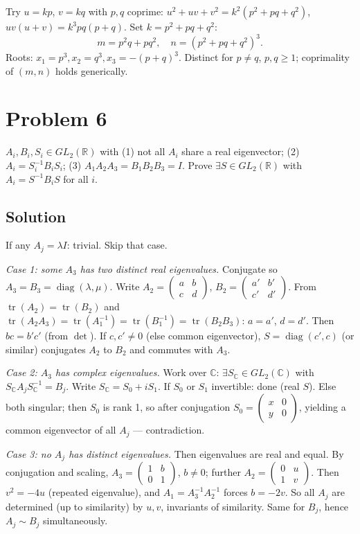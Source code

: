 \documentclass{article}
\begin{document}
Try $u = kp$, $v = kq$ with $p, q$ coprime: $u^2 + uv + v^2 = k^2(p^2 + pq + q^2)$, $uv(u+v) = k^3 pq(p+q)$. Set $k = p^2 + pq + q^2$:
\[
m = p^2 q + pq^2, \quad n = (p^2 + pq + q^2)^3.
\]
Roots: $x_1 = p^3, x_2 = q^3, x_3 = -(p+q)^3$. Distinct for $p \ne q$, $p, q \ge 1$; coprimality of $(m, n)$ holds generically.

\section*{Problem 6}
$A_i, B_i, S_i \in GL_2(\mathbb{R})$ with (1) not all $A_i$ share a real eigenvector; (2) $A_i = S_i^{-1} B_i S_i$; (3) $A_1 A_2 A_3 = B_1 B_2 B_3 = I$. Prove $\exists S \in GL_2(\mathbb{R})$ with $A_i = S^{-1} B_i S$ for all $i$.

\subsection*{Solution}
If any $A_j = \lambda I$: trivial. Skip that case.

\emph{Case 1: some $A_3$ has two distinct real eigenvalues.} Conjugate so $A_3 = B_3 = \operatorname{diag}(\lambda, \mu)$. Write $A_2 = \begin{pmatrix}a & b\\c & d\end{pmatrix}$, $B_2 = \begin{pmatrix}a' & b'\\c' & d'\end{pmatrix}$. From $\operatorname{tr}(A_2) = \operatorname{tr}(B_2)$ and $\operatorname{tr}(A_2 A_3) = \operatorname{tr}(A_1^{-1}) = \operatorname{tr}(B_1^{-1}) = \operatorname{tr}(B_2 B_3)$: $a = a'$, $d = d'$. Then $bc = b'c'$ (from $\det$). If $c, c' \ne 0$ (else common eigenvector), $S = \operatorname{diag}(c', c)$ (or similar) conjugates $A_2$ to $B_2$ and commutes with $A_3$.

\emph{Case 2: $A_3$ has complex eigenvalues.} Work over $\mathbb{C}$: $\exists S_\mathbb{C} \in GL_2(\mathbb{C})$ with $S_\mathbb{C} A_j S_\mathbb{C}^{-1} = B_j$. Write $S_\mathbb{C} = S_0 + i S_1$. If $S_0$ or $S_1$ invertible: done (real $S$). Else both singular; then $S_0$ is rank 1, so after conjugation $S_0 = \begin{pmatrix}x & 0 \\ y & 0\end{pmatrix}$, yielding a common eigenvector of all $A_j$ --- contradiction.

\emph{Case 3: no $A_j$ has distinct eigenvalues.} Then eigenvalues are real and equal. By conjugation and scaling, $A_3 = \begin{pmatrix}1 & b\\0 & 1\end{pmatrix}$, $b \ne 0$; further $A_2 = \begin{pmatrix}0 & u\\1 & v\end{pmatrix}$. Then $v^2 = -4u$ (repeated eigenvalue), and $A_1 = A_3^{-1} A_2^{-1}$ forces $b = -2v$. So all $A_j$ are determined (up to similarity) by $u, v$, invariants of similarity. Same for $B_j$, hence $A_j \sim B_j$ simultaneously.
\end{document}
